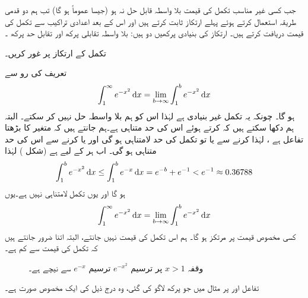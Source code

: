 جب کسی غیر مناسب تکمل کی قیمت بلا واسطہ قابل حل نہ ہو (جیسا عموماً ہو گا) تب ہم دو  قدمی طریقہ استعمال کرتے ہوئے پہلے ارتکاز ثابت کرتے ہیں اور اس کے بعد اعدادی تراکیب سے تکمل کی قیمت دریافت کرتے ہیں۔ ارتکاز کی  بنیادی پرکھیں  دو ہیں: بلا واسطہ تقابلی پرکھ اور تقابل حد پرکھ ۔

تکمل  کے ارتکاز پر غور کریں۔

تعریف کی رو سے
\begin{align*}
\int_1^{\infty}e^{-x^2}\dif x=\lim_{b\to \infty}\int_1^b e^{-x^2}\dif x
\end{align*}
ہو گا۔ چونکہ یہ تکمل غیر بنیادی ہے لہٰذا اس کو ہم بلا واسطہ حل نہیں کر سکتے۔ البتہ ہم دکھا سکتے ہیں کہ  کرتے ہوئے اس کی حد متناہی ہے۔ہم جانتے ہیں کہ  متغیر  کا بڑھتا تفاعل ہے ، لہٰذا  کرنے سے یا تو   تکمل کی حد  لامتناہی ہو گی اور یا  کرنے سے اس کی حد متناہی ہو گی۔ اب ہر  کے لیے  ہے (شکل ) لہٰذا
\begin{align*}
\int_1^be^{-x^2}\dif x\le \int_1^be^{-x}\dif x=e^{-b}+e^{-1}<e^{-1}\approx 0.36788
\end{align*}
ہو گا اور یوں تکمل لامتناہی نہیں ہے۔یوں
\begin{align*}
\int_1^{\infty}e^{-x^2}\dif x=\lim_{b\to\infty}\int_1^be^{-x^2}\dif x
\end{align*}
کسی مخصوص قیمت پر  مرتکز ہو گا۔ ہم اس تکمل کی قیمت نہیں جانتے، البتہ اتنا ضرور جانتے ہیں کہ تکمل کی قیمت  سے کم ہے۔
\begin{figure}
\centering
{}
\caption
{وقفہ $x>1$ پر ترسیم $e^{-x^2}$ ترسیم $e^{-x}$ سے نیچے ہے۔}
\label{شکل_مثال_طریقہ_ارتکاز_پرکھ}
\end{figure}
تفاعل  اور  پر مثال  میں جو   پرکھ لاگو کی گئی، وہ درج ذیل کی ایک مخصوص صورت ہے۔


